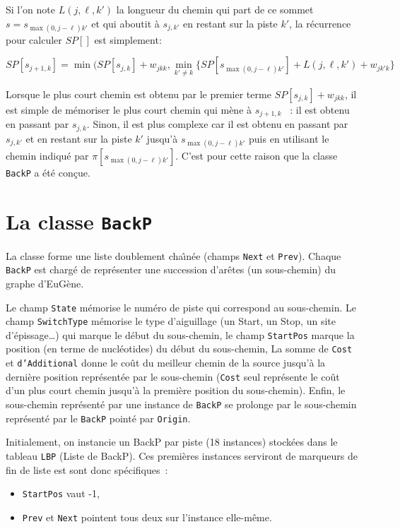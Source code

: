 \documentclass[a4paper]{article}
\begin{document}
Si l'on note $L(j,\ell,k')$ la longueur du chemin qui part de ce sommet
$s= s_{\max(0,j-\ell)k'}$ et qui aboutit \`a $s_{j,k'}$ en restant sur la
piste $k'$, la r\'ecurrence pour calculer $SP[]$ est simplement:

\[SP[s_{j+1,k}] = \min(SP[s_{j,k}]+w_{jkk} , \min_{k'\neq k} \{ SP[s_{\max(0,j-\ell)k'}]+L(j,\ell,k')+w_{jk'k}\} \]

Lorsque le plus court chemin est obtenu par le premier terme
$SP[s_{j,k}]+w_{jkk}$, il est simple de m\'emoriser le plus court chemin
qui m\`ene \`a $s_{j+1,k}$ ~: il est obtenu en passant par $s_{j,k}$.
Sinon, il est plus complexe car il est obtenu en passant par
$s_{j,k'}$ et en restant sur la piste $k'$ jusqu'\`a
$s_{\max(0,j-\ell)k'}$ puis en utilisant le chemin indiqu\'e par
$\pi[s_{\max(0,j-\ell)k'}]$. C'est pour cette raison que la classe
\texttt{BackP} a \'et\'e con\c cue.

\section{La classe \texttt{BackP}}

La classe forme une liste doublement cha\^\i n\'ee (champs \texttt{Next} et
\texttt{Prev}). Chaque \texttt{BackP} est charg\'e de repr\'esenter une
succession d'ar\^etes (un sous-chemin) du graphe d'EuG\`ene. 

Le champ \texttt{State} m\'emorise le num\'ero de piste qui correspond au
sous-chemin. Le champ \texttt{SwitchType} m\'emorise le type
d'aiguillage (un Start, un Stop, un site d'\'epissage\ldots) qui marque le
d\'ebut du sous-chemin, le champ \texttt{StartPos} marque la position
(en terme de nucl\'eotides) du d\'ebut du sous-chemin, La somme de
\texttt{Cost} et \texttt{d'Additional} donne le co\^ut du meilleur
chemin de la source jusqu'\`a la derni\`ere position repr\'esent\'ee par le
sous-chemin (\texttt{Cost} seul repr\'esente le co\^ut d'un plus court
chemin jusqu'\`a la premi\`ere position du sous-chemin). Enfin, le
sous-chemin repr\'esent\'e par une instance de \texttt{BackP} se prolonge
par le sous-chemin repr\'esent\'e par le \texttt{BackP} point\'e par
\texttt{Origin}.

Initialement, on instancie un BackP par piste (18 instances) stock\'ees
dans le tableau \texttt{LBP} (Liste de BackP). Ces premi\`eres instances
serviront de marqueurs de fin de liste est sont donc sp\'ecifiques~:
\begin{itemize}
\item \texttt{StartPos} vaut -1,
\item \texttt{Prev} et \texttt{Next} pointent tous deux sur l'instance
  elle-m\^eme.
\end{itemize}
\end{document}

